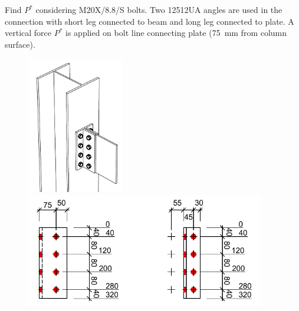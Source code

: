 \begin{exmp}
Find $P^*$ considering M20X/8.8/S bolts. Two 125\texttimes12UA angles are used in the connection with short leg connected to beam and long leg connected to plate. A vertical force $P^*$ is applied on bolt line connecting plate (\SI{75}{\mm} from column surface).
\begin{figure}[H]
\includegraphics[height=6cm]{PIC/CH08/BTC}\hfill
\includegraphics[height=5cm]{PIC/CH08/BTCD}
\end{figure}
\end{exmp}
